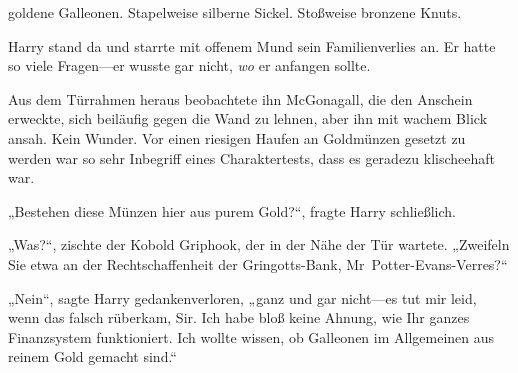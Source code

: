  goldene Galleonen. Stapelweise silberne Sickel. Stoßweise bronzene Knuts.

\hplettrineextrapara
Harry stand da und starrte mit offenem Mund sein Familienverlies an. Er hatte so viele Fragen—er wusste gar nicht, \emph{wo} er anfangen sollte.

Aus dem Türrahmen heraus beobachtete ihn McGonagall, die den Anschein erweckte, sich beiläufig gegen die Wand zu lehnen, aber ihn mit wachem Blick ansah. Kein Wunder. Vor einen riesigen Haufen an Goldmünzen gesetzt zu werden war so sehr Inbegriff eines Charaktertests, dass es geradezu klischeehaft war.

„Bestehen diese Münzen hier aus purem Gold?“, fragte Harry schließlich.

„Was?“, zischte der Kobold Griphook, der in der Nähe der Tür wartete. „Zweifeln Sie etwa an der Rechtschaffenheit der Gringotts-Bank, Mr~Potter-Evans-Verres?“

„Nein“, sagte Harry gedankenverloren, „ganz und gar nicht—es tut mir leid, wenn das falsch rüberkam, Sir. Ich habe bloß keine Ahnung, wie Ihr ganzes Finanzsystem funktioniert. Ich wollte wissen, ob Galleonen im Allgemeinen aus reinem Gold gemacht sind.“

